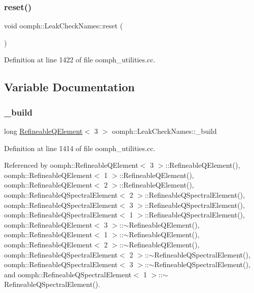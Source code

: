 \mbox{\label{namespaceoomph_1_1LeakCheckNames_a0ce3a9e079632ff8ff7e5d9c4258c620}} 
\subsubsection{\texorpdfstring{reset()}{reset()}}
{\footnotesize\ttfamily void oomph\+::\+Leak\+Check\+Names\+::reset (\begin{DoxyParamCaption}{ }\end{DoxyParamCaption})}



Definition at line 1422 of file oomph\+\_\+utilities.\+cc.



\subsection{Variable Documentation}
\mbox{\label{namespaceoomph_1_1LeakCheckNames_a6073b8e2ad2b94519b899f11682b3e07}} 
\subsubsection{\texorpdfstring{\+\_\+build}{\_build}}
{\footnotesize\ttfamily long \hyperlink{classoomph_1_1RefineableQElement}{Refineable\+Q\+Element}$<$ 3 $>$ oomph\+::\+Leak\+Check\+Names\+::\+\_\+build}



Definition at line 1414 of file oomph\+\_\+utilities.\+cc.



Referenced by oomph\+::\+Refineable\+Q\+Element$<$ 3 $>$\+::\+Refineable\+Q\+Element(), oomph\+::\+Refineable\+Q\+Element$<$ 1 $>$\+::\+Refineable\+Q\+Element(), oomph\+::\+Refineable\+Q\+Element$<$ 2 $>$\+::\+Refineable\+Q\+Element(), oomph\+::\+Refineable\+Q\+Spectral\+Element$<$ 2 $>$\+::\+Refineable\+Q\+Spectral\+Element(), oomph\+::\+Refineable\+Q\+Spectral\+Element$<$ 3 $>$\+::\+Refineable\+Q\+Spectral\+Element(), oomph\+::\+Refineable\+Q\+Spectral\+Element$<$ 1 $>$\+::\+Refineable\+Q\+Spectral\+Element(), oomph\+::\+Refineable\+Q\+Element$<$ 3 $>$\+::$\sim$\+Refineable\+Q\+Element(), oomph\+::\+Refineable\+Q\+Element$<$ 1 $>$\+::$\sim$\+Refineable\+Q\+Element(), oomph\+::\+Refineable\+Q\+Element$<$ 2 $>$\+::$\sim$\+Refineable\+Q\+Element(), oomph\+::\+Refineable\+Q\+Spectral\+Element$<$ 2 $>$\+::$\sim$\+Refineable\+Q\+Spectral\+Element(), oomph\+::\+Refineable\+Q\+Spectral\+Element$<$ 3 $>$\+::$\sim$\+Refineable\+Q\+Spectral\+Element(), and oomph\+::\+Refineable\+Q\+Spectral\+Element$<$ 1 $>$\+::$\sim$\+Refineable\+Q\+Spectral\+Element().

